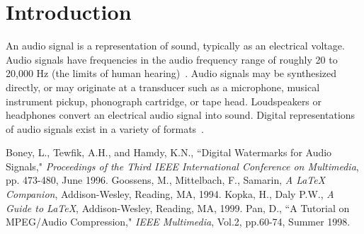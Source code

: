 \documentclass{article}
\begin{document}
\maketitle 
\section{Introduction}
An audio signal is a representation of sound, typically as an
electrical voltage. Audio signals have frequencies in the audio
frequency range of roughly 20 to 20,000 Hz (the limits of human
hearing)~\cite{Boney96}.
Audio signals may be synthesized directly, or may originate at a
transducer such as a microphone, musical instrument pickup,
phonograph cartridge, or tape head. Loudspeakers or headphones
convert an electrical audio signal into sound. Digital
representations of audio signals exist in a variety of
formats~\cite{MG,HK,Pan}.
\begin{thebibliography}{100} %
 Boney, L., Tewfik, A.H., and Hamdy, K.N., ``Digital
Watermarks for Audio Signals," \emph{Proceedings of the Third IEEE
International Conference on Multimedia}, pp. 473-480, June 1996.
 Goossens, M., Mittelbach, F., Samarin, \emph{A LaTeX
Companion}, Addison-Wesley, Reading, MA, 1994.
 Kopka, H., Daly P.W., \emph{A Guide to LaTeX},
Addison-Wesley, Reading, MA, 1999.
 Pan, D., ``A Tutorial on MPEG/Audio Compression,"
\emph{IEEE
Multimedia}, Vol.2, pp.60-74, Summer 1998.
\end{thebibliography}
\end{document}
